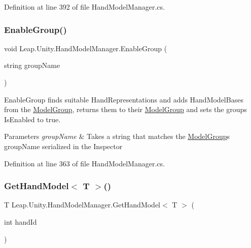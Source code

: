 Definition at line 392 of file Hand\+Model\+Manager.\+cs.

\mbox{\label{class_leap_1_1_unity_1_1_hand_model_manager_a4d6c8b759ff06758408ec0228a006417}} 
\subsubsection{\texorpdfstring{EnableGroup()}{EnableGroup()}}
{\footnotesize\ttfamily void Leap.\+Unity.\+Hand\+Model\+Manager.\+Enable\+Group (\begin{DoxyParamCaption}\item[{string}]{group\+Name }\end{DoxyParamCaption})}

Enable\+Group finds suitable Hand\+Representations and adds Hand\+Model\+Bases from the \mbox{\hyperlink{class_leap_1_1_unity_1_1_hand_model_manager_1_1_model_group}{Model\+Group}}, returns them to their \mbox{\hyperlink{class_leap_1_1_unity_1_1_hand_model_manager_1_1_model_group}{Model\+Group}} and sets the groups Is\+Enabled to true. 
\begin{DoxyParams}{Parameters}
{\em group\+Name} & Takes a string that matches the \mbox{\hyperlink{class_leap_1_1_unity_1_1_hand_model_manager_1_1_model_group}{Model\+Group}}\textquotesingle{}s group\+Name serialized in the Inspector \\
\hline
\end{DoxyParams}


Definition at line 363 of file Hand\+Model\+Manager.\+cs.

\mbox{\label{class_leap_1_1_unity_1_1_hand_model_manager_a387a153890d97fea2fd72118fb5dfe53}} 
\subsubsection{\texorpdfstring{GetHandModel$<$ T $>$()}{GetHandModel< T >()}}
{\footnotesize\ttfamily T Leap.\+Unity.\+Hand\+Model\+Manager.\+Get\+Hand\+Model$<$ T $>$ (\begin{DoxyParamCaption}\item[{int}]{hand\+Id }\end{DoxyParamCaption})}

